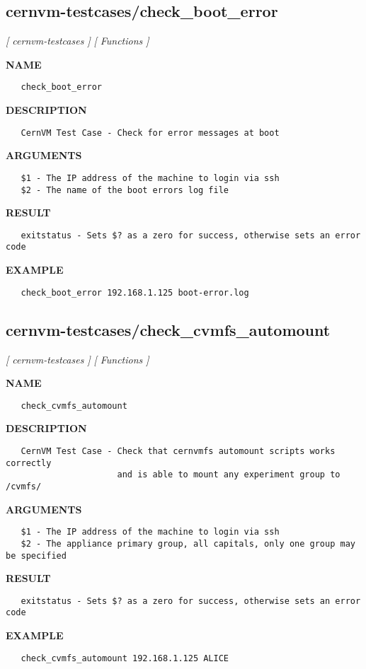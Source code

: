 \subsection{cernvm-testcases/check\_boot\_error}
\textsl{[ cernvm-testcases ]}
\textsl{[ Functions ]}

\label{ch:robo17}
\label{ch:cernvm_testcases_check_boot_error}
\textbf{NAME}
\begin{verbatim}
   check_boot_error
\end{verbatim}
\textbf{DESCRIPTION}
\begin{verbatim}
   CernVM Test Case - Check for error messages at boot
\end{verbatim}
\textbf{ARGUMENTS}
\begin{verbatim}
   $1 - The IP address of the machine to login via ssh
   $2 - The name of the boot errors log file
\end{verbatim}
\textbf{RESULT}
\begin{verbatim}
   exitstatus - Sets $? as a zero for success, otherwise sets an error code
\end{verbatim}
\textbf{EXAMPLE}
\begin{verbatim}
   check_boot_error 192.168.1.125 boot-error.log
\end{verbatim}
\newpage
\subsection{cernvm-testcases/check\_cvmfs\_automount}
\textsl{[ cernvm-testcases ]}
\textsl{[ Functions ]}

\label{ch:robo18}
\label{ch:cernvm_testcases_check_cvmfs_automount}
\textbf{NAME}
\begin{verbatim}
   check_cvmfs_automount
\end{verbatim}
\textbf{DESCRIPTION}
\begin{verbatim}
   CernVM Test Case - Check that cernvmfs automount scripts works correctly
                      and is able to mount any experiment group to /cvmfs/
\end{verbatim}
\textbf{ARGUMENTS}
\begin{verbatim}
   $1 - The IP address of the machine to login via ssh
   $2 - The appliance primary group, all capitals, only one group may be specified
\end{verbatim}
\textbf{RESULT}
\begin{verbatim}
   exitstatus - Sets $? as a zero for success, otherwise sets an error code
\end{verbatim}
\textbf{EXAMPLE}
\begin{verbatim}
   check_cvmfs_automount 192.168.1.125 ALICE
\end{verbatim}
\newpage
